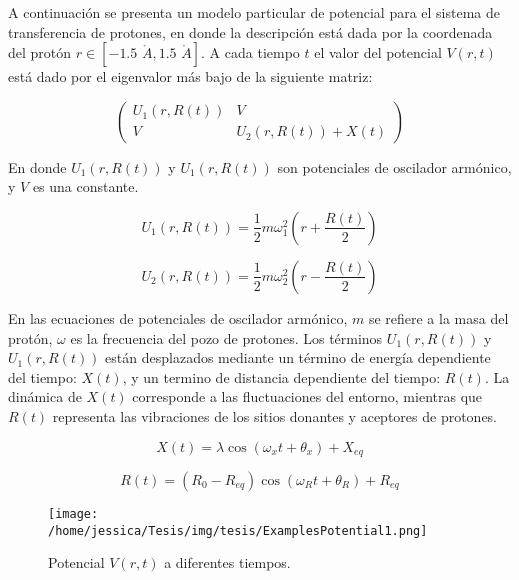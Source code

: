 A continuación se presenta un modelo particular de potencial para el sistema de transferencia de protones, en donde la descripción está dada por la coordenada del protón $r \in [-1.5 \,\,\mathring{A}, 1.5 \,\,\mathring{A}]$. A cada tiempo $t$ el valor del potencial $V(r,t)$ está dado por el eigenvalor más bajo de la siguiente matriz:

\begin{equation}
  \label{eq:matrixPot}
  \begin{pmatrix}
    U_1(r,R(t)) &   V \\
    V           & U_2(r,R(t))+X(t)
  \end{pmatrix}
\end{equation}

En donde $U_1(r,R(t))$ y  $U_1(r,R(t))$ son potenciales de oscilador armónico, y $V$ es una constante.

\begin{equation}
  \label{eq:U1}
  U_1(r,R(t))=\frac{1}{2}m\omega_1^2\left( r + \frac{R(t)}{2} \right)
\end{equation}

\begin{equation}
  \label{eq:U2}
  U_2(r,R(t))=\frac{1}{2}m\omega_2^2\left( r - \frac{R(t)}{2} \right)
\end{equation}

En las ecuaciones de potenciales de oscilador armónico, $m$ se refiere a la masa del protón, $\omega$ es la frecuencia del pozo de protones. Los términos $U_1(r,R(t))$ y  $U_1(r,R(t))$ están desplazados mediante un término de energía dependiente del tiempo: $X(t)$, y un termino de distancia dependiente del tiempo: $R(t)$. La dinámica de $X(t)$ corresponde a las fluctuaciones del entorno, mientras que $R(t)$ representa las vibraciones de los sitios donantes y aceptores de protones. \cite{Main:2021}

\begin{equation}
  \label{eq:X(t)}
  X(t)=\lambda \cos(\omega_xt+\theta_x)+X_{eq}
\end{equation}

\begin{equation}
  \label{eq:R(t)}
  R(t)=(R_0-R_{eq})\cos(\omega_Rt + \theta_R) + R_{eq}
\end{equation}

\begin{figure}[ht]
  \centering
  \texttt{[image: /home/jessica/Tesis/img/tesis/ExamplesPotential1.png]}
  \caption{Potencial $V(r,t)$ a diferentes tiempos.}
  \label{fig:drawPot}
\end{figure}

